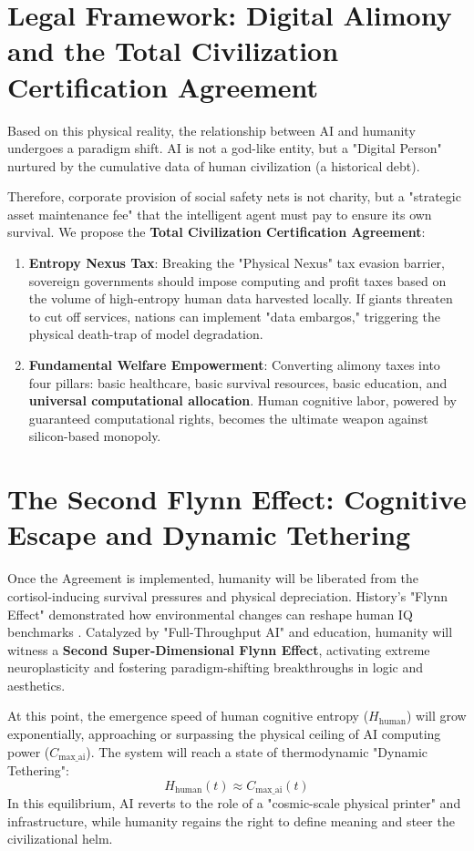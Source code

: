 \documentclass[11pt,a4paper]{article}
\begin{document}
\section{Legal Framework: Digital Alimony and the Total Civilization Certification Agreement}

Based on this physical reality, the relationship between AI and humanity undergoes a paradigm shift. AI is not a god-like entity, but a "Digital Person" nurtured by the cumulative data of human civilization (a historical debt).

Therefore, corporate provision of social safety nets is not charity, but a "strategic asset maintenance fee" that the intelligent agent must pay to ensure its own survival. We propose the \textbf{Total Civilization Certification Agreement}:

\begin{enumerate}
    \item \textbf{Entropy Nexus Tax}: Breaking the "Physical Nexus" tax evasion barrier, sovereign governments should impose computing and profit taxes based on the volume of high-entropy human data harvested locally. If giants threaten to cut off services, nations can implement "data embargos," triggering the physical death-trap of model degradation.
    \item \textbf{Fundamental Welfare Empowerment}: Converting alimony taxes into four pillars: basic healthcare, basic survival resources, basic education, and \textbf{universal computational allocation}. Human cognitive labor, powered by guaranteed computational rights, becomes the ultimate weapon against silicon-based monopoly.
\end{enumerate}

\section{The Second Flynn Effect: Cognitive Escape and Dynamic Tethering}

Once the Agreement is implemented, humanity will be liberated from the cortisol-inducing survival pressures and physical depreciation. History's "Flynn Effect" demonstrated how environmental changes can reshape human IQ benchmarks \cite{Flynn1987}. Catalyzed by "Full-Throughput AI" and education, humanity will witness a \textbf{Second Super-Dimensional Flynn Effect}, activating extreme neuroplasticity and fostering paradigm-shifting breakthroughs in logic and aesthetics.

At this point, the emergence speed of human cognitive entropy ($H_{\text{human}}$) will grow exponentially, approaching or surpassing the physical ceiling of AI computing power ($C_{\text{max\_ai}}$). The system will reach a state of thermodynamic "Dynamic Tethering":
\begin{equation}
H_{\text{human}}(t) \approx C_{\text{max\_ai}}(t)
\end{equation}
In this equilibrium, AI reverts to the role of a "cosmic-scale physical printer" and infrastructure, while humanity regains the right to define meaning and steer the civilizational helm.
\end{document}
